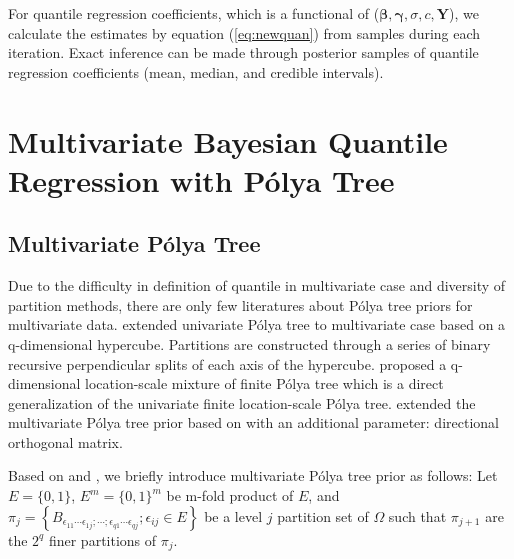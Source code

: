\documentclass[12pt]{article}
\newcommand{\polya}{P\'{o}lya}
\begin{document}
For quantile regression coefficients, which is a functional of ($\bm
\beta, \bm \gamma, \sigma, c, \bm Y$), we calculate the estimates by
equation (\ref{eq:newquan}) from samples during each iteration. Exact
inference can be made through posterior samples of quantile regression
coefficients (mean, median, and credible intervals).

\section{Multivariate Bayesian Quantile Regression with \polya{} Tree}
\label{sec:multi}

\subsection{Multivariate \polya{} Tree}

Due to the difficulty in definition of quantile in multivariate case
and diversity of partition methods, there are only few literatures
about \polya{} tree priors for multivariate data. \citet{paddock1999,
  paddock2002} extended univariate \polya{} tree
\citep{lavine1992,lavine1994} to multivariate case based on a
q-dimensional hypercube. Partitions are constructed through a series
of binary recursive perpendicular splits of each axis of the
hypercube. \citet{hanson2006} proposed a q-dimensional location-scale
mixture of finite \polya{} tree which is a direct generalization of
the univariate finite location-scale \polya{} tree. \citet{jara2009}
extended the multivariate \polya{} tree prior based on
\citet{hanson2006} with an additional parameter: directional
orthogonal matrix.

Based on \citet{hanson2006} and \citet{jara2009}, we briefly introduce
multivariate \polya{} tree prior as follows: Let $E=\{0,1\}$,
$E^m=\{0,1\}^m$ be m-fold product of $E$, and $\pi_j = \left\{
  B_{\epsilon_{11}\cdots
    \epsilon_{1j};\cdots;\epsilon_{q1}\cdots\epsilon_{qj}};
  \epsilon_{ij}\in E \right\}$ be a level $j$ partition set of
$\Omega$ such that $\pi_{j+1}$ are the $2^q$ finer partitions of
$\pi_j$.
\end{document}
